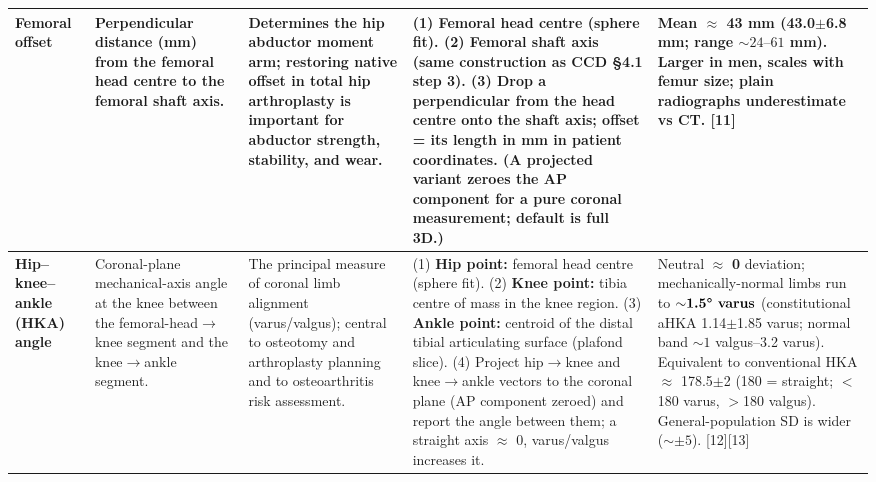 \documentclass[10pt]{article}
\begin{document}
\begin{footnotesize}
\begin{longtable}{L{2.5cm} L{4.0cm} L{4.0cm} L{9.2cm} L{5.4cm}}
\textbf{Femoral offset} &
Perpendicular distance (mm) from the femoral head centre to the femoral shaft axis. &
Determines the hip abductor moment arm; restoring native offset in total hip
arthroplasty is important for abductor strength, stability, and wear. &
(1) Femoral head centre (sphere fit). (2) Femoral shaft axis (same construction as CCD
\S4.1 step 3). (3) Drop a perpendicular from the head centre onto the shaft axis;
offset = its length in mm in patient coordinates. (A projected variant zeroes the AP
component for a pure coronal measurement; default is full 3D.) &
Mean $\approx$ \textbf{43 mm} (43.0$\pm$6.8 mm; range ${\sim}24\text{--}61$ mm). Larger
in men, scales with femur size; plain radiographs underestimate vs CT. [11] \\
\midrule

\textbf{Hip--knee--ankle (HKA) angle} &
Coronal-plane mechanical-axis angle at the knee between the femoral-head$\rightarrow$knee
segment and the knee$\rightarrow$ankle segment. &
The principal measure of coronal limb alignment (varus/valgus); central to osteotomy and
arthroplasty planning and to osteoarthritis risk assessment. &
(1) \textbf{Hip point:} femoral head centre (sphere fit). (2) \textbf{Knee point:} tibia
centre of mass in the knee region. (3) \textbf{Ankle point:} centroid of the distal
tibial articulating surface (plafond slice). (4) Project hip$\rightarrow$knee and
knee$\rightarrow$ankle vectors to the coronal plane (AP component zeroed) and report the
angle between them; a straight axis $\approx$ 0\textdegree{}, varus/valgus increases it. &
Neutral $\approx$ \textbf{0\textdegree{}} deviation; mechanically-normal limbs run to
${\sim}\textbf{1.5\textdegree{} varus}$ (constitutional aHKA
1.14\textdegree{}$\pm$1.85\textdegree{} varus; normal band ${\sim}1$\textdegree{}
valgus--3.2\textdegree{} varus). Equivalent to conventional HKA $\approx$
178.5\textdegree{}$\pm$2\textdegree{} (180\textdegree{} = straight; $<$180\textdegree{}
varus, $>$180\textdegree{} valgus). General-population SD is wider (${\sim}\pm5$\textdegree{}).
[12][13] \\
\midrule


\end{longtable}
\end{footnotesize}
\end{document}
